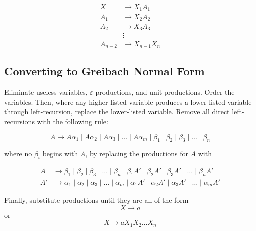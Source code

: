\begin{align*}
    X &\to X_1A_1\\
    A_1 &\to X_2A_2\\
    A_2 &\to X_3A_3\\
        &\vdots \\
    A_{n-2} &\to X_{n-1}X_n
\end{align*}

\subsection{Converting to Greibach Normal Form}
Eliminate useless variables, \(\varepsilon \)-productions, and unit productions. Order the variables. Then, where any higher-listed variable produces a lower-listed variable through left-recursion, replace the lower-listed variable. Remove all direct left-recursions with the following rule:

\[A\to A\alpha_1 \mid A\alpha_2 \mid A\alpha_3 \mid \hdots \mid A\alpha_m \mid \beta_1 \mid \beta_2 \mid \beta_3 \mid \hdots \mid \beta_n\] 

where no \(\beta_i\) begins with \(A\), by replacing the productions for \(A\) with 

\begin{align*}
    A  &\to \beta_1\mid \beta_2\mid \beta_3\mid \hdots \mid \beta_n\mid\beta_1 A'\mid \beta_2 A'\mid \beta_3 A'\mid \hdots \mid \beta_n A'\\
    A' &\to \alpha_1\mid \alpha_2\mid \alpha_3\mid \hdots \mid \alpha_m\mid \alpha_1 A'\mid \alpha_2 A'\mid \alpha_3 A' \mid \hdots \mid \alpha_m A'
\end{align*}

Finally, substitute productions until they are all of the form \[X\to a\] or \[X\to aX_1 X_2\hdots X_n\]